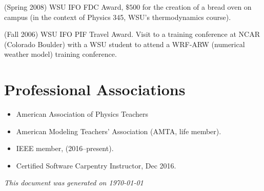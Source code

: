 \documentclass[margin,line,letterpaper]{res}
\begin{document}
\begin{resume}
(Spring 2008) WSU IFO FDC Award, $\$500$ for the creation of a bread oven on campus (in the context of Physics 345, WSU's thermodynamics course).

(Fall 2006) WSU IFO PIF Travel Award.  Visit to a training conference at NCAR (Colorado Boulder) with a WSU student to attend a WRF-ARW (numerical weather model) training conference.








\section{\bf Professional Associations}
\begin{itemize}
\item American Association of Physics Teachers 
\item American Modeling Teachers' Association (AMTA, life member).
\item IEEE member, (2016--present).
\item Certified Software Carpentry Instructor, Dec 2016.
\end{itemize}

\textit{This document was generated on \today}
\end{resume}
\end{document}
